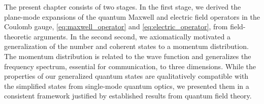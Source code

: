 
The present chapter consists of two stages.
In the first stage, we derived the plane-mode expansions of the quantum Maxwell and electric field operators in the Coulomb gauge, \cref{eq:maxwell_operator} and \cref{eq:electric_operator}, from field-theoretic arguments.
In the second second, we axiomatically motivated a generalization of the number and coherent states to a momentum distribution.
The momentum distribution is related to the wave function and generalizes the frequency spectrum, essential for communication, to three dimensions.
While the properties of our generalized quantum states are qualitatively compatible with the simplified states from single-mode quantum optics, we presented them in a consistent framework justified by established results from quantum field theory.

